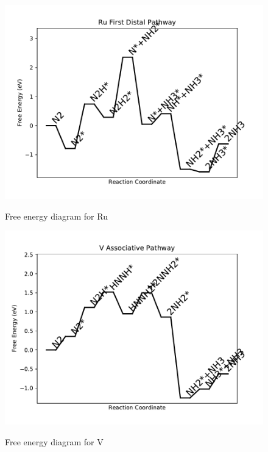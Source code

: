 \documentclass{article}
\begin{document}
\begin{figure}
\includegraphics[width=1\linewidth]{data/plots/Ru_distal_1.pdf}
\label{fig:Ru_distal_1}
\caption{Free energy diagram for Ru}
\end{figure}

\begin{figure}
\includegraphics[width=1\linewidth]{data/plots/V_associative.pdf}
\label{fig:V_associative}
\caption{Free energy diagram for V}
\end{figure}
\end{document}
